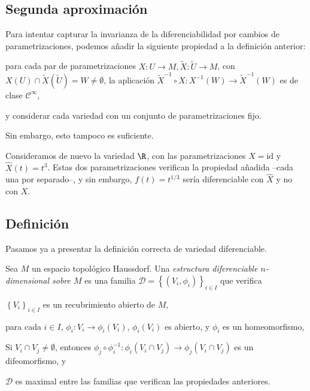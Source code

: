 \subsection{Segunda aproximación}

Para intentar capturar la invarianza de la diferenciabilidad por cambios de
parametrizaciones, podemos añadir la siguiente propiedad a la definición anterior:
\begin{nlist}
\setcounter{enumi}{1}
\item
  para cada par de parametrizaciones $X: U \to M, \tilde{X}: \tilde{U}\to M$,
  con $X(U)\cap \tilde{X}(\tilde{U}) = W \ne \emptyset$, la aplicación
  $\tilde{X}^{-1}\circ X: X^{-1}(W)\to \tilde{X}^{-1}(W)$ es de clase $\mathscr{C}^{\infty}$,
\end{nlist}
y considerar cada variedad con un conjunto de parametrizaciones fijo.

Sin embargo, esto tampoco es suficiente.
\begin{ejemplo}
  Consideramos de nuevo la variedad $\R$, con las parametrizaciones $X =
\mathrm{id}$ y $\hat{X}(t) = t^{3}$. Estas dos parametrizaciones verifican la
propiedad añadida --cada una por separado--, y sin embargo, $f(t) = t^{1/3}$
sería diferenciable con $\hat{X}$ y no con $X$.
\end{ejemplo}

\subsection{Definición}

Pasamos ya a presentar la definición correcta de variedad diferenciable.
\begin{ndef}
  Sea $M$ un espacio topológico Haussdorf. Una \emph{estructura diferenciable
    $n$-dimensional sobre $M$} es una familia $\mathscr{D} = \left\{ (V_{i},
    \phi_{i}) \right\}_{i\in I}$ que verifica
  \begin{nlist}
  \item
    $\left\{ V_{i} \right\}_{i\in I}$ es un recubrimiento abierto de $M$,
  \item para cada $i\in I$, $\phi_{i}: V_{i} \to \phi_{i}(V_{i})$,
  $\phi_{i}(V_{i})$ es abierto, y $\phi_{i}$ es un homeomorfismo,
  \item
    Si $V_{i}\cap V_{j}\ne\emptyset$, entonces $\phi_{j}\circ \phi_{i}^{-1}:
    \phi_{i}(V_{i}\cap V_{j})\to \phi_{j}(V_{i}\cap V_{j})$ es un difeomorfismo, y
  \item
    $\mathscr{D}$ es maximal entre las familias que verifican las propiedades anteriores.
  \end{nlist}
\end{ndef}

